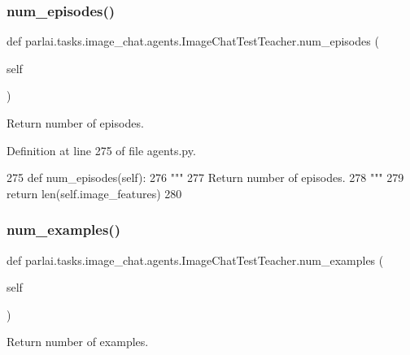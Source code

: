 \subsubsection{\texorpdfstring{num\+\_\+episodes()}{num\_episodes()}}
{\footnotesize\ttfamily def parlai.\+tasks.\+image\+\_\+chat.\+agents.\+Image\+Chat\+Test\+Teacher.\+num\+\_\+episodes (\begin{DoxyParamCaption}\item[{}]{self }\end{DoxyParamCaption})}

\begin{DoxyVerb}Return number of episodes.
\end{DoxyVerb}
 

Definition at line 275 of file agents.\+py.


\begin{DoxyCode}
275     \textcolor{keyword}{def }num\_episodes(self):
276         \textcolor{stringliteral}{"""}
277 \textcolor{stringliteral}{        Return number of episodes.}
278 \textcolor{stringliteral}{        """}
279         \textcolor{keywordflow}{return} len(self.image\_features)
280 
\end{DoxyCode}
\mbox{\label{classparlai_1_1tasks_1_1image__chat_1_1agents_1_1ImageChatTestTeacher_a5e5478cfc559bafed513c2421da53662}} 
\subsubsection{\texorpdfstring{num\+\_\+examples()}{num\_examples()}}
{\footnotesize\ttfamily def parlai.\+tasks.\+image\+\_\+chat.\+agents.\+Image\+Chat\+Test\+Teacher.\+num\+\_\+examples (\begin{DoxyParamCaption}\item[{}]{self }\end{DoxyParamCaption})}

\begin{DoxyVerb}Return number of examples.
\end{DoxyVerb}
 

